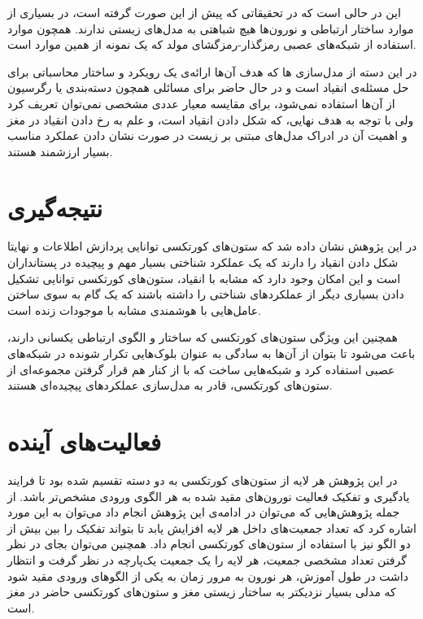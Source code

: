 \documentclass[12pt]{report}
\begin{document}
	این در حالی است که در تحقیقاتی که پیش از این صورت گرفته است، در بسیاری از موارد ساختار ارتباطی و نورون‌ها هیچ شباهتی به مدل‌های زیستی ندارند. همچون موارد استفاده از شبکه‌های عصبی رمزگذار-رمزگشای مولد که یک نمونه از همین موارد است.
	
	در این دسته از مدل‌سازی ها که هدف آن‌ها ارائه‌ی یک رویکرد و ساختار محاسباتی برای حل مسئله‌ی انقیاد است و در حال حاضر برای مسائلی همچون دسته‌بندی یا رگرسیون از آن‌ها استفاده نمی‌شود، برای مقایسه معیار عددی مشخصی نمی‌توان تعریف کرد ولی با توجه به هدف نهایی، که شکل دادن انقیاد است، و علم به رخ دادن انقیاد در مغز و اهمیت آن در ادراک مدل‌های مبتنی بر زیست در صورت نشان دادن عملکرد مناسب بسیار ارزشمند هستند.
	
	\section{نتیجه‌گیری}
	در این پژوهش نشان داده شد که ستون‌های کورتکسی توانایی پردازش اطلاعات و نهایتا شکل دادن انقیاد را دارند که یک عملکرد شناختی بسیار مهم و پیچیده در پستانداران است و این امکان وجود دارد که مشابه با انقیاد، ستون‌های کورتکسی توانایی تشکیل دادن بسیاری دیگر از عملکرد‌های شناختی را داشته باشند که یک گام به سوی ساختن عامل‌هایی با هوشمندی مشابه با موجودات زنده است.
	
	همچنین این ویژگی ستون‌های کورتکسی که ساختار و الگوی ارتباطی یکسانی دارند، باعث می‌شود تا بتوان از آن‌ها به سادگی به عنوان بلوک‌هایی تکرار شونده در شبکه‌های عصبی استفاده کرد و شبکه‌هایی ساخت که با از کنار هم قرار گرفتن مجموعه‌ای از ستون‌های کورتکسی، قادر به مدل‌سازی عملکرد‌های پیچیده‌ای هستند.
	
	\section{فعالیت‌های آینده}
	در این پژوهش هر لایه از ستون‌های کورتکسی به دو دسته تقسیم شده بود تا فرایند یادگیری و تفکیک فعالیت نورون‌های مقید شده به هر الگوی ورودی مشخص‌تر باشد. از جمله پژوهش‌هایی که می‌توان در ادامه‌ی این پژوهش انجام داد می‌توان به این مورد اشاره کرد که تعداد جمعیت‌‌های داخل هر لایه افزایش یابد تا بتواند تفکیک را بین بیش از دو الگو نیز با استفاده از ستون‌های کورتکسی انجام داد. همچنین می‌توان بجای در نظر گرفتن تعداد مشخصی جمعیت، هر لایه را یک جمعیت یک‌پارچه در نظر گرفت و انتظار داشت در طول آموزش، هر نورون به مرور زمان به یکی از الگو‌های ورودی مقید شود که  مدلی بسیار نزدیکتر به ساختار زیستی مغز و ستون‌های کورتکسی حاضر در مغز است.

	
	
	
	
\end{document}
